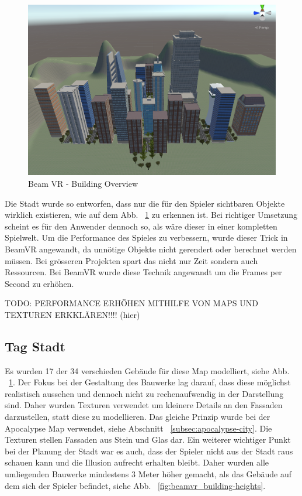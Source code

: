 \begin {figure}
    \centering
    \includegraphics[scale=0.18]{pics/beamvr_building-variety}
    \caption{Beam VR - Building Overview}
    \label{fig:beamvr_building-variety}
\end {figure}

Die Stadt wurde so entworfen, dass nur die für den Spieler sichtbaren Objekte wirklich existieren, wie auf dem Abb. ~\ref{fig:beamvr_building-variety} zu erkennen ist.
Bei richtiger Umsetzung scheint es für den Anwender dennoch so, als w\"are dieser in einer kompletten Spielwelt.
Um die Performance des Spieles zu verbessern, wurde dieser Trick in BeamVR angewandt, da unn\"otige Objekte nicht gerendert oder berechnet werden m\"ussen.
Bei gr\"osseren Projekten spart das nicht nur Zeit sondern auch Ressourcen.
Bei BeamVR wurde diese Technik angewandt um die Frames per Second zu erh\"ohen.

TODO: PERFORMANCE ERHÖHEN MITHILFE VON MAPS UND TEXTUREN ERKKLÄREN!!!! (hier)


\subsection{Tag Stadt}\label{subsec:day-city}
Es wurden 17 der 34 verschieden Geb\"aude f\"ur diese Map modelliert, siehe Abb. ~\ref{fig:beamvr_building-variety}.
Der Fokus bei der Gestaltung des Bauwerke lag darauf, dass diese m\"oglichst realistisch aussehen und dennoch nicht zu rechenaufwendig in der Darstellung sind.
Daher wurden Texturen verwendet um kleinere Details an den Fassaden darzustellen, statt diese zu modellieren.
Das gleiche Prinzip wurde bei der Apocalypse Map verwendet, siehe Abschnitt ~\ref{subsec:apocalypse-city}.
Die Texturen stellen Fassaden aus Stein und Glas dar.
Ein weiterer wichtiger Punkt bei der Planung der Stadt war es auch, dass der Spieler nicht aus der Stadt raus schauen kann und die Illusion aufrecht erhalten bleibt.
Daher wurden alle umliegenden Bauwerke mindestens 3 Meter h\"oher gemacht, als das Geb\"aude auf dem sich der Spieler befindet, siehe Abb. ~\ref{fig:beamvr_building-heights}.


